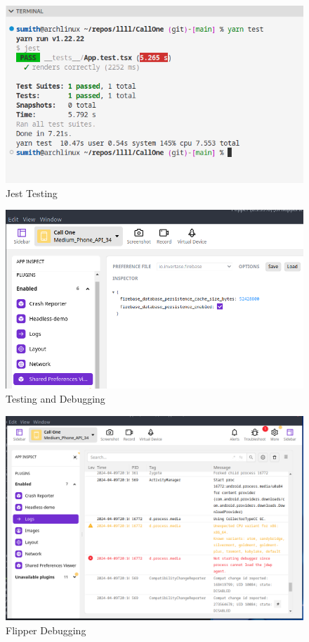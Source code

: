 \begin{figure}
    \centering
    \includegraphics[width=1\linewidth]{Media//Chapter 6/jest.png}
    \caption{Jest Testing}
    \label{fig:JestTesting}
\end{figure}

\begin{figure}
    \centering
    \includegraphics[width=1\linewidth]{Media//Chapter 6/sharedprefs.png}
    \caption{Testing and Debugging}
    \label{fig: Testing and Debugging}
\end{figure}

\begin{figure}
    \centering
    \includegraphics[width=1\linewidth]{Media//Chapter 6/flipper.png}
    \caption{Flipper Debugging}
    \label{fig:Flipper Debugging Tool}
\end{figure}


